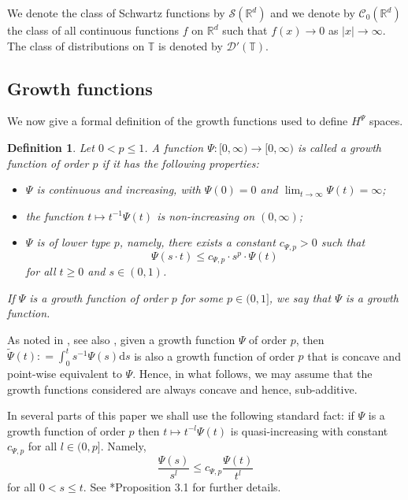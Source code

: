 \documentclass[a4paper, leqno, 10pt]{amsart}
\numberwithin{equation}{section}
\newtheorem{define}[thm]{Definition}
\newcommand{\dd}{\mathrm{d}}
\newcommand{\T}{\mathbb{T}}
\newcommand{\R}{\mathbb{R}}
\begin{document}
We denote the class of Schwartz functions by $ \mathcal{S} (\R^d)$ and we denote by $ \mathcal{C}_0 (\R^d)$ the class of all continuous functions $f$ on $\R^d$ such that $f (x) \rightarrow 0$ as $|x| \rightarrow \infty$. The class of distributions on $\T$ is denoted by $\mathcal{D}'(\T)$.

%

\subsection{Growth functions}
We now give a formal definition of the growth functions used to define $H^{\Psi}$ spaces.
\begin{define}\label{main_def}
Let $0 < p \leq 1$. A function $\Psi : [0, \infty) \rightarrow [0, \infty)$ is called a {\it growth function of order} $p$ if it has the following properties: \begin{itemize}
\item  $\Psi$ is continuous and increasing, with $\Psi (0) = 0$ and 
$\lim_{t\to \infty}\Psi (t)=\infty$;
\item the function $t \mapsto t^{-1}\Psi(t)$ is non-increasing on $(0, \infty)$; 
\item  $\Psi$ is of lower type $p$, namely, there exists a constant $c_{\Psi, p} >0$ such that
\[
\Psi (s \cdot t) \leq c_{\Psi, p} \cdot s^p \cdot \Psi (t) 
\]
for all $t \geq 0$ and $s \in (0,1)$.
\end{itemize} 

If $\Psi$ is a growth function of order $p$ for some $p \in (0, 1 ]$, we say that $\Psi$ is a {\it   growth function}. 
\end{define}
 
As noted in \cite{BG}, see also \cite{V}, given a growth function $\Psi$ of order $p$, then $\widetilde{\Psi} (t) : = \int_0^t s^{-1} \Psi (s) \dd s$ is also a growth function of order $p$ that is concave and point-wise equivalent to $\Psi$. Hence, in what follows, we may assume that the growth functions considered are always concave and hence, sub-additive. 


In several parts of this paper we shall use the following standard fact: if $\Psi$ is a growth function of order $p$ then $t \mapsto t^{-l} \Psi (t)$ is quasi-increasing with constant $c_{\Psi, p}$ for all $l \in (0, p]$. Namely,
\begin{equation}\label{eq:growth}
\frac{\Psi (s)} {s^l} \leq c_{\Psi, p } \frac{\Psi (t)} {t^l}
\end{equation}
for all $0<s \leq t$. See \cite{V}*{Proposition 3.1} for further details.
%
\end{document}
